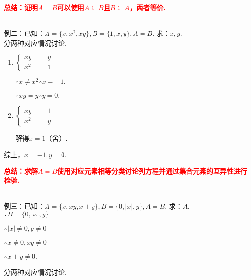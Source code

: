 \documentclass[8pt]{article}
\begin{document}
				\textcolor{red}{\textbf{总结：证明$A=B$可以使用$A\subseteq B$且$B\subseteq A$，两者等价.}}
				
				~\\

				\textbf{例二}：已知：$A=\{x,x^2,xy\}, B=\{1,x,y\}, A=B$. 求：$x,y$.
				~\\

				分两种对应情况讨论.

				\begin{enumerate}[label=$\arabic*^{\circ}$]

					\item $\displaystyle \left\{\begin{array}{rcl}xy&=&y\\x^2&=&1\end{array}\right.$

						$\because x\neq x^2 \therefore x=-1.$

						$\because xy=y \therefore y=0.$

					\item $\displaystyle \left\{\begin{array}{rcl}xy&=&1\\x^2&=&y\end{array}\right.$

						解得$x=1$（舍）.

				\end{enumerate}

				综上，$x=-1, y=0$.

				\textcolor{red}{\textbf{总结：求解$A=B$使用对应元素相等分类讨论列方程并通过集合元素的互异性进行检验.}}

				~\\

				\textbf{例三}：已知：$A=\{x,xy,x+y\}, B=\{0,|x|,y\}, A=B$. 求：$A$.
				~\\

				$\because B=\{0,|x|,y\}$

				$\therefore |x|\neq 0, y\neq 0$

				$\therefore x\neq 0, xy\neq 0$

				$\therefore x+y\neq 0.$

				分两种对应情况讨论.
\end{document}
